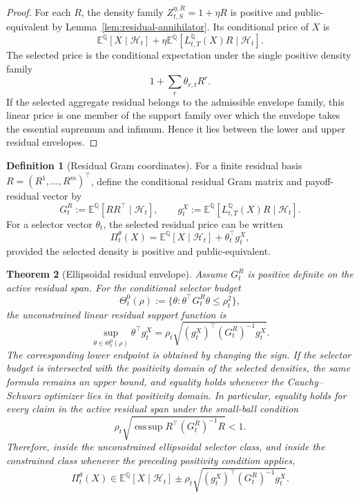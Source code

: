 \documentclass[11pt,a4paper]{amsart}
\theoremstyle{plain}
\newtheorem{theorem}{Theorem}[section]
\theoremstyle{definition}
\newtheorem{definition}[theorem]{Definition}
\theoremstyle{remark}
\newcommand{\QQ}{\mathbb{Q}}
\newcommand{\EE}{\mathbb{E}}
\newcommand{\cH}{\mathcal{H}}
\begin{document}
\begin{proof}
For each \(R\), the density family \(Z_{t,S}^{\eta,R}=1+\eta R\) is positive and
public-equivalent by Lemma~\ref{lem:residual-annihilator}.  Its conditional price of \(X\) is
\[
        \EE^\QQ[X\mid\cH_t]
        +
        \eta\EE^\QQ[L_{t,T}^\QQ(X)R\mid\cH_t].
\]
The selected price is the conditional expectation under the single positive density family
\[
        1+\sum_r\theta_{r,t}R^r.
\]
If the selected aggregate residual belongs to the admissible envelope family, this linear price
is one member of the support family over which the envelope takes the essential supremum and
infimum.  Hence it lies between the lower and upper residual envelopes.
\end{proof}

\begin{definition}[Residual Gram coordinates]\label{def:residual-gram-coordinates}
For a finite residual basis \(R=(R^1,\dots,R^m)^\top\), define the conditional residual Gram
matrix and payoff-residual vector by
\[
        G_t^R:=\EE^\QQ[RR^\top\mid\cH_t],
        \qquad
        g_t^X:=
        \EE^\QQ[L_{t,T}^\QQ(X)R\mid\cH_t].
\]
For a selector vector \(\theta_t\), the selected residual price can be written
\[
        \Pi_t^\theta(X)
        =
        \EE^\QQ[X\mid\cH_t]+\theta_t^\top g_t^X,
\]
provided the selected density is positive and public-equivalent.
\end{definition}

\begin{theorem}[Ellipsoidal residual envelope]\label{thm:ellipsoidal-residual-envelope}
Assume \(G_t^R\) is positive definite on the active residual span.  For the conditional selector
budget
\[
        \Theta_t^0(\rho):=
        \{\theta:\theta^\top G_t^R\theta\le\rho_t^2\},
\]
the unconstrained linear residual support function is
\[
        \sup_{\theta\in\Theta_t^0(\rho)}
        \theta^\top g_t^X
        =
        \rho_t\sqrt{(g_t^X)^\top(G_t^R)^{-1}g_t^X}.
\]
The corresponding lower endpoint is obtained by changing the sign.  If the selector budget is
intersected with the positivity domain of the selected densities, the same formula remains an
upper bound, and equality holds whenever the Cauchy--Schwarz optimizer lies in that positivity
domain.  In particular, equality holds for every claim in the active residual span under the
small-ball condition
\[
        \rho_t
        \sqrt{
        \operatorname*{ess\,sup}
        R^\top(G_t^R)^{-1}R
        }
        <1 .
\]
Therefore, inside the unconstrained ellipsoidal selector class, and inside the constrained class
whenever the preceding positivity condition applies,
\[
        \Pi_t^\theta(X)
        \in
        \EE^\QQ[X\mid\cH_t]
        \pm
        \rho_t\sqrt{(g_t^X)^\top(G_t^R)^{-1}g_t^X}.
\]
\end{theorem}
\end{document}

